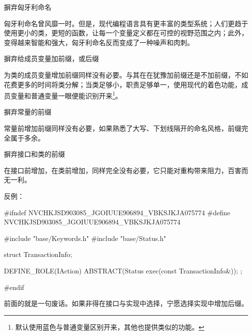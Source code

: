 \begin{content}

\begin{advise}
摒弃匈牙利命名
\end{advise}

匈牙利命名曾风靡一时。但是，现代编程语言具有更丰富的类型系统；人们更趋于使用更小的类，更短的函数，让每一个变量定义都在可控的视野范围之内；此外，变得越来智能和强大，匈牙利命名反而变成了一种噪声和肉刺。

\begin{advise}
摒弃给成员变量加前缀，或后缀
\end{advise}

为类的成员变量增加前缀同样没有必要。与其在在犹豫加前缀还是不加前缀，不如花费更多的时间将类分解；当类足够小，职责足够单一，使用现代的着色功能，成员变量和普通变量一眼便能识别开来\footnote{默认使用蓝色与普通变量区别开来，其他也提供类似的功能。}。

\begin{advise}
摒弃常量的前缀
\end{advise}

常量前增加前缀同样没有必要，如果熟悉了大写、下划线隔开的命名风格，前缀完全属于多余。

\begin{advise}
摒弃接口和类的前缀
\end{advise}

在接口前增加，在类前增加，同样完全没有必要，它只能对重构带来阻力，百害而无一利。

反例：
\begin{leftbar}
\begin{c++}[caption={trans-dsl/sched/IAction.h}]
#ifndef NVCHKJSD903085_JGOIUUE906894_VBKSJKJA075774
#define NVCHKJSD903085_JGOIUUE906894_VBKSJKJA075774    

#include "base/Keywords.h"
#include "base/Status.h"

struct TransactionInfo;

DEFINE_ROLE(IAction)
{
    ABSTRACT(Status exec(const TransactionInfo&));
};

#endif
\end{c++}
\end{leftbar}

前面的就是一句废话。如果非得在接口与实现中选择，宁愿选择实现中增加后缀。

\end{content}

